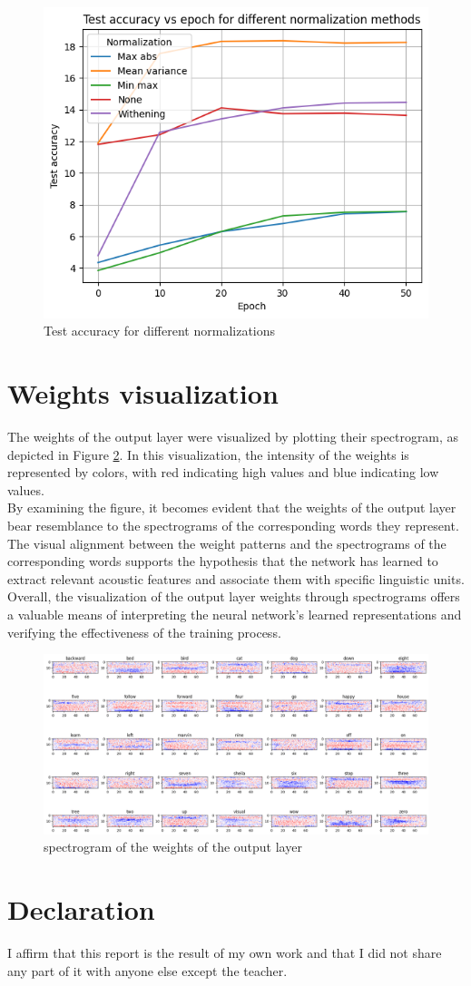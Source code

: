 \documentclass{class}
\begin{document}
\begin{figure}[H]
  \centering
  \includegraphics[width=.7\columnwidth]{images/test_diff_normalizations.png}
  \caption{Test accuracy for different normalizations}
  \label{fig-8}
\end{figure}
\section{Weights visualization}
The weights of the output layer were visualized by plotting their spectrogram, as depicted in Figure \ref{fig-9}.
In this visualization, the intensity of the weights is represented by colors, with red indicating high values and blue indicating low values. \\
By examining the figure, it becomes evident that the weights of the output layer bear resemblance to the spectrograms of the corresponding words they represent.
The visual alignment between the weight patterns and the spectrograms of the corresponding words supports the hypothesis that
the network has learned to extract relevant acoustic features and associate them with specific linguistic units. \\
Overall, the visualization of the output layer weights through spectrograms offers a valuable means of interpreting the neural network's
learned representations and verifying the effectiveness of the training process.

\begin{figure}[H]
  \centering
  \includegraphics[width=\columnwidth]{images/spectrogram_weights.png}
  \caption{spectrogram of the weights of the output layer}
  \label{fig-9}
\end{figure}

\section{Declaration}
I affirm that this report is the result of my own work and that I did not share any part of it with anyone
else except the teacher.
\end{document}
